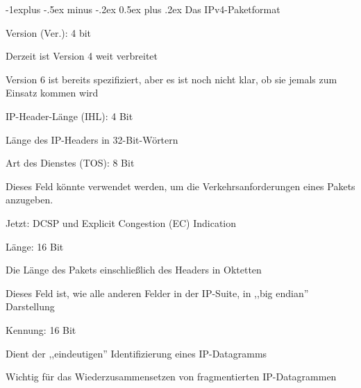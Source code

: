 \documentclass[a4paper]{article}
\makeatletter
\renewcommand{\subsection}{\@startsection{subsection}{2}{0mm}%
 {-1explus -.5ex minus -.2ex}%
 {0.5ex plus .2ex}%
 {\normalfont\normalsize\bfseries}}
\makeatother
\begin{document}
\begin{multicols}{3}
      \subsection{Das IPv4-Paketformat}
      \begin{itemize*}
            \item Version (Ver.): 4 bit
            \begin{itemize*}
                  \item Derzeit ist Version 4 weit verbreitet
                  \item Version 6 ist bereits spezifiziert, aber es ist noch nicht klar, ob sie jemals zum Einsatz kommen wird
            \end{itemize*}
            \item IP-Header-Länge (IHL): 4 Bit
            \begin{itemize*}
                  \item Länge des IP-Headers in 32-Bit-Wörtern
            \end{itemize*}
            \item Art des Dienstes (TOS): 8 Bit
            \begin{itemize*}
                  \item Dieses Feld könnte verwendet werden, um die Verkehrsanforderungen eines Pakets anzugeben.
                  \item Jetzt: DCSP und Explicit Congestion (EC) Indication
            \end{itemize*}
            \item Länge: 16 Bit
            \begin{itemize*}
                  \item Die Länge des Pakets einschließlich des Headers in Oktetten
                  \item Dieses Feld ist, wie alle anderen Felder in der IP-Suite, in ,,big endian'' Darstellung
            \end{itemize*}
            \item Kennung: 16 Bit
            \begin{itemize*}
                  \item Dient der ,,eindeutigen'' Identifizierung eines IP-Datagramms
                  \item Wichtig für das Wiederzusammensetzen von fragmentierten IP-Datagrammen
            \end{itemize*}

\end{itemize*}
\end{multicols}
\end{document}
